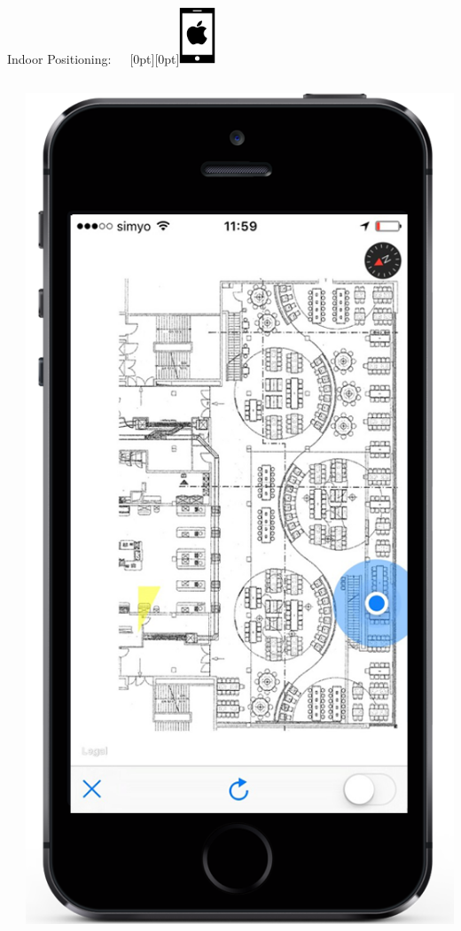 \documentclass[11pt]{beamer}
\begin{document}
\begin{frame}{Indoor Positioning:~~~\raisebox{-10pt}[0pt][0pt]{\includegraphics[width=0.08\textwidth]{tech-stack-apple}}}
\begin{columns}[T]
\begin{column}{.6\textwidth}
\begin{itemize}
  \end{itemize}
  \end{column}
  \begin{column}{.4\textwidth}
  \includegraphics[scale=0.25]{applesignalgood}
  \end{column}
\end{columns}

\end{frame}
\end{document}
